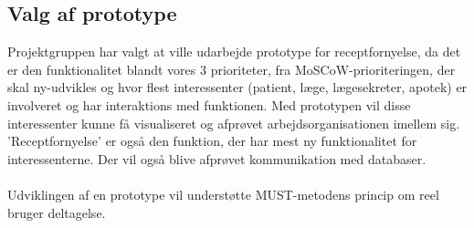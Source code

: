 \subsection{Valg af prototype}
Projektgruppen har valgt at ville udarbejde prototype for receptfornyelse, da det er den funktionalitet blandt vores 3 prioriteter, fra MoSCoW-prioriteringen, der skal ny-udvikles og hvor flest interessenter (patient, læge, lægesekreter, apotek) er involveret og har interaktions med funktionen. Med prototypen vil disse interessenter kunne få visualiseret og afprøvet arbejdsorganisationen imellem sig. ’Receptfornyelse’ er også den funktion, der har mest ny funktionalitet for interessenterne. 
Der vil også blive afprøvet kommunikation med databaser. \\ 
\\
Udviklingen af en prototype vil understøtte MUST-metodens princip om reel bruger deltagelse.